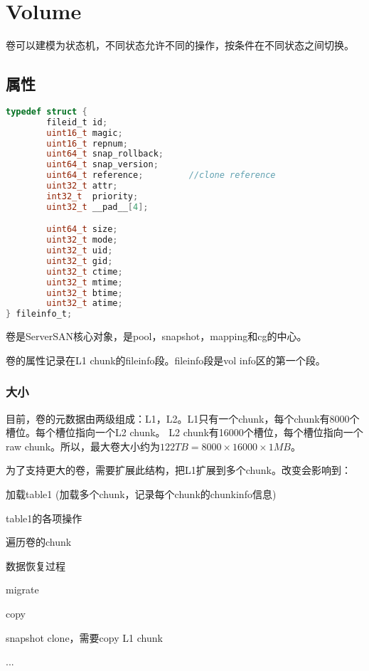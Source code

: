 \chapter{Volume}

卷可以建模为状态机，不同状态允许不同的操作，按条件在不同状态之间切换。

\section{属性}

\begin{lstlisting}[language=c,frame=single]
typedef struct {
        fileid_t id;
        uint16_t magic;
        uint16_t repnum;
        uint64_t snap_rollback;
        uint64_t snap_version;
        uint64_t reference;         //clone reference
        uint32_t attr;
        int32_t  priority;
        uint32_t __pad__[4];

        uint64_t size;
        uint32_t mode;
        uint32_t uid;
        uint32_t gid;
        uint32_t ctime;
        uint32_t mtime;
        uint32_t btime;
        uint32_t atime;
} fileinfo_t;
\end{lstlisting}

卷是ServerSAN核心对象，是pool，snapshot，mapping和cg的中心。

卷的属性记录在L1 chunk的fileinfo段。fileinfo段是vol info区的第一个段。

\subsection{大小}

目前，卷的元数据由两级组成：L1，L2。L1只有一个chunk，每个chunk有8000个槽位。每个槽位指向一个L2 chunk。
L2 chunk有16000个槽位，每个槽位指向一个raw chunk。所以，最大卷大小约为$122TB = 8000 \times 16000 \times 1MB$。

为了支持更大的卷，需要扩展此结构，把L1扩展到多个chunk。改变会影响到：
\begin{compactitem}
\item 加载table1 (加载多个chunk，记录每个chunk的chunkinfo信息)
\item table1的各项操作
\item 遍历卷的chunk
\item 数据恢复过程
\item migrate
\item copy
\item snapshot clone，需要copy L1 chunk
\item ...
\end{compactitem}


